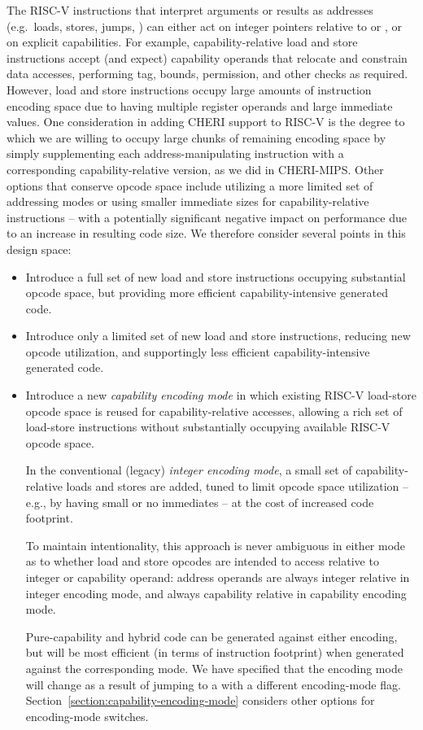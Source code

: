 The RISC-V instructions that interpret arguments or results as addresses
(e.g.\ loads, stores, jumps, ) can either act on integer pointers
relative to \DDC{} or \PCC{}, or on explicit capabilities.
For example, capability-relative load and store instructions accept (and expect) capability
operands that relocate and constrain data accesses, performing tag, bounds,
permission, and other checks as required.
However, load and store instructions occupy large amounts of instruction
encoding space due to having multiple register operands and large immediate
values.
One consideration in adding CHERI support to RISC-V is the degree to which we
are willing to occupy large chunks of remaining encoding space by simply
supplementing each address-manipulating instruction with a
corresponding capability-relative version, as we did in CHERI-MIPS.
Other options that conserve opcode space include utilizing a more limited set
of addressing modes or using smaller immediate sizes for capability-relative
instructions -- with a potentially significant negative impact on performance
due to an increase in resulting code size.
We therefore consider several points in this design space:

\begin{itemize}
\item Introduce a full set of new load and store instructions occupying
  substantial opcode space, but providing more efficient capability-intensive
  generated code.

\item Introduce only a limited set of new load and store instructions,
  reducing new opcode utilization, and supportingly less efficient
  capability-intensive generated code.

\item Introduce a new \textit{capability encoding mode} in which
  existing RISC-V load-store opcode space is reused for capability-relative
  accesses, allowing a rich set of load-store instructions without
  substantially occupying available RISC-V opcode space.

  In the conventional (legacy) \textit{integer encoding mode}, a small set of
  capability-relative loads and stores are added, tuned to limit opcode
  space utilization -- e.g., by having small or no immediates -- at the cost
  of increased code footprint.

  To maintain intentionality, this approach is never ambiguous in either mode
  as to whether load and store opcodes are intended to access relative to
  integer or capability operand: address operands are always integer relative
  in integer encoding mode, and always capability relative in capability
  encoding mode.

  Pure-capability and hybrid code can be generated against either encoding,
  but will be most efficient (in terms of instruction footprint) when
  generated against the corresponding mode.
  We have specified that the encoding mode will change as a result of jumping
  to a \PCC{} with a different encoding-mode flag.
  Section~\ref{section:capability-encoding-mode} considers other options for
  encoding-mode switches.
\end{itemize}

